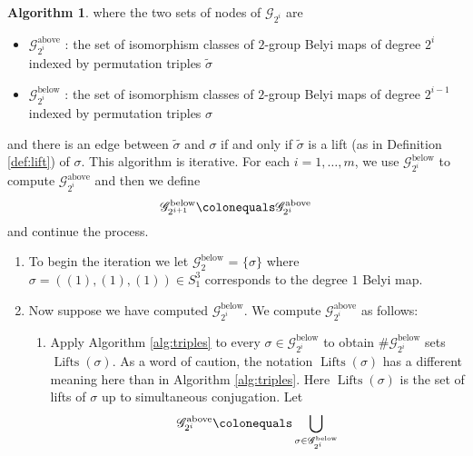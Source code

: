 \documentclass{dcthesis}
\newcommand{\wt}[1]{\widetilde{#1}}
\DeclareMathOperator{\Lifts}{Lifts}
\theoremstyle{definition}
\newtheorem{alg}[prop]{Algorithm}
\theoremstyle{remark}
\numberwithin{equation}{section}
\numberwithin{figure}{section}
\begin{document}
{{\begin{alg}
      where the two sets of nodes of $\mathscr{G}_{2^i}$
      are
      \begin{itemize}
        \item
          $\mathscr{G}_{2^i}^\text{above}$ :
          the set of isomorphism classes of $2$-group Belyi maps
          of degree $2^i$ indexed by permutation triples $\wt{\sigma}$
        \item
          $\mathscr{G}_{2^i}^\text{below}$ :
          the set of isomorphism classes of $2$-group Belyi maps
          of degree $2^{i-1}$ indexed by permutation triples $\sigma$
      \end{itemize}
      and there is an edge between $\wt{\sigma}$ and $\sigma$
      if and only if $\wt{\sigma}$ is a lift
      (as in Definition \ref{def:lift})
      of $\sigma$.
      This algorithm is iterative.
      For each $i=1,\dots,m$,
      we use $\mathscr{G}_{2^i}^\text{below}$ to
      compute $\mathscr{G}_{2^i}^\text{above}$
      and then we define
      \[
        \mathscr{G}_{2^{i+1}}^\text{below}\colonequals\mathscr{G}_{2^i}^\text{above}
      \]
      and continue the process.
      \begin{enumerate}
        \item
          To begin the iteration we
          let $\mathscr{G}_2^\text{below}$ = $\{\sigma\}$
          where $\sigma = ((1),(1),(1))\in S_1^3$
          corresponds to the degree $1$ Belyi map.
        \item
          Now suppose we have computed $\mathscr{G}_{2^i}^\text{below}$.
          We compute $\mathscr{G}_{2^i}^\text{above}$ as follows:
          \begin{enumerate}
            \item
              Apply Algorithm \ref{alg:triples} to every
              $\sigma\in\mathscr{G}_{2^i}^\text{below}$
              to obtain
              $\#\mathscr{G}_{2^i}^\text{below}$
              sets
              $\Lifts(\sigma)$.
              As a word of caution,
              the notation $\Lifts(\sigma)$ has
              a different meaning here than in
              Algorithm \ref{alg:triples}.
              Here $\Lifts(\sigma)$ is the set of
              lifts of $\sigma$ up to simultaneous
              conjugation.
              Let
              \[
                \mathscr{G}_{2^i}^\text{above}
                \colonequals
                \bigcup_{\sigma\in\mathscr{G}_{2^i}^\text{below}}
\]
\end{enumerate}
\end{enumerate}
\end{alg}}}
\end{document}
